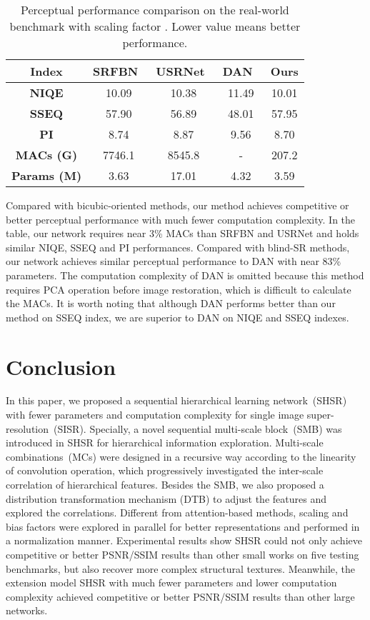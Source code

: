 \documentclass[manuscript,screen]{acmart}
\begin{document}
\begin{table*}[t]
	\centering
	\caption{Perceptual performance comparison on the real-world benchmark with scaling factor . Lower value means better performance.}
	\label{tab:iqa}
	\fontsize{6.5}{8}\selectfont
	\begin{tabular}{|c||c|c||c||c|}
		\hline
		\textbf{Index}& \textbf{SRFBN~\cite{srfbn_cvpr2019}}& \textbf{USRNet~\cite{usrnet_cvpr2020}}& \textbf{DAN~\cite{dan_nips2020}} &\textbf{Ours}\\
		\hline
		\textbf{NIQE}& 10.09& 10.38& 11.49& 10.01 \\
		\textbf{SSEQ}& 57.90& 56.89& 48.01& 57.95 \\
		\textbf{PI}& 8.74& 8.87& 9.56& 8.70 \\
		\hline
		\textbf{MACs (G)}& 7746.1& 8545.8& -& 207.2 \\
		\textbf{Params (M)}& 3.63& 17.01& 4.32& 3.59 \\
		\hline
	\end{tabular}
\end{table*}

Compared with bicubic-oriented methods, our method achieves competitive or better perceptual performance with much fewer computation complexity. In the table, our network requires near 3\% MACs than SRFBN and USRNet and holds similar NIQE, SSEQ and PI performances. Compared with blind-SR methods, our network achieves similar perceptual performance to DAN with near 83\% parameters. The computation complexity of DAN is omitted because this method requires PCA operation before image restoration, which is difficult to calculate the MACs. It is worth noting that although DAN performs better than our method on SSEQ index, we are superior to DAN on NIQE and SSEQ indexes. 


\section{Conclusion}
In this paper, we proposed a sequential hierarchical learning network~(SHSR) with fewer parameters and computation complexity for single image super-resolution~(SISR). Specially, a novel sequential multi-scale block~(SMB) was introduced in SHSR for hierarchical information exploration. Multi-scale combinations~(MCs) were designed in a recursive way according to the linearity of convolution operation, which progressively investigated the inter-scale correlation of hierarchical features. Besides the SMB, we also proposed a distribution transformation mechanism (DTB) to adjust the features and explored the correlations. Different from attention-based methods, scaling and bias factors were explored in parallel for better representations and performed in a normalization manner. Experimental results show SHSR could not only achieve competitive or better PSNR/SSIM results than other small works on five testing benchmarks, but also recover more complex structural textures. Meanwhile, the extension model SHSR with much fewer parameters and lower computation complexity achieved competitive or better PSNR/SSIM results than other large networks.
\end{document}
